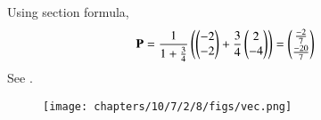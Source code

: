 Using section formula, 
\begin{align}
\mathbf{P}&=\frac{1}{1+\frac{3}{4}}\left(\begin{pmatrix}-2\\-2\end{pmatrix}+\frac{3}{4}\begin{pmatrix}2\\-4\end{pmatrix}\right)
=\begin{pmatrix}\frac{-2}{7}\\[1pt] \frac{-20}{7}\end{pmatrix}
\end{align}
See 
   .
\begin{figure}
   \centering 
 \texttt{[image: chapters/10/7/2/8/figs/vec.png]}
   \caption{}
   \label{fig:chapters/10/7/2/8/vec.png}
   \end{figure}
